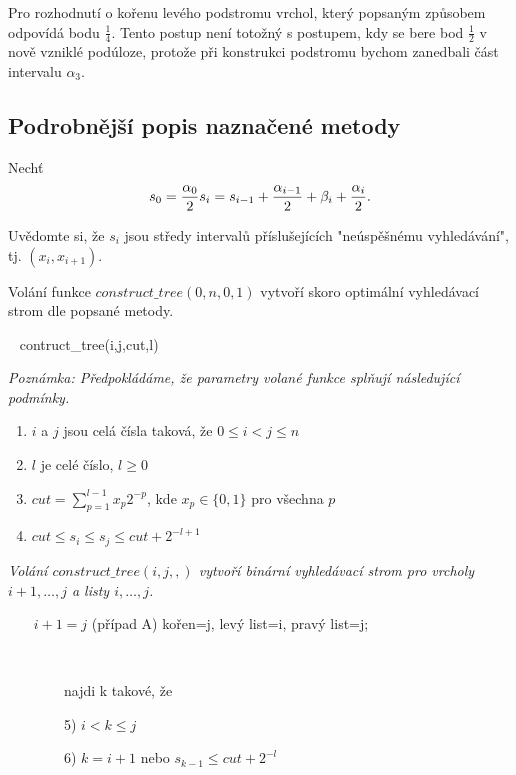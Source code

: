 \par
Pro rozhodnutí o kořenu levého podstromu vrchol, který popsaným způ\-sobem odpovídá bodu $\frac{1}{4}$. Tento postup není totožný s postupem, 
kdy se bere bod $\frac{1}{2}$ v 
nově vzniklé podúloze, protože při konstrukci podstromu bychom zanedbali část intervalu $\alpha_3$.

\subsection{Podrobnější popis naznačené metody}

Nechť 
\begin{equation} 
s_0 = \frac{\alpha_0}{2} \\ s_i = s_{i-1} + \frac{\alpha_{i-1}}{2} + \beta_i + \frac{\alpha_i}{2}.
\end{equation}

\par
Uvědomte si, že $s_i$ jsou středy intervalů příslušejících "neúspěšnému
vy\-hle\-dá\-vá\-ní", tj. $(x_i,x_{i+1})$.

\par
Volání funkce $construct\_tree(0,n,0,1)$ vytvoří skoro optimální
vyhledávací strom dle popsané metody.

\ \newline
{} contruct\_tree(i,j,cut,l)

\emph{Poznámka: Předpokládáme, že parametry volané funkce splňují následující podmínky.}
\begin{enumerate}
\item $i$ a $j$ jsou celá čísla taková, že $0 \leq i < j \leq n$
\item $l$ je celé číslo, $l \geq 0$
\item $cut=\sum_{p=1}^{l-1}{x_p 2^{-p}}$, kde $x_p \in \{0, 1\}$ pro všechna $p$
\item $cut \leq s_i \leq s_j \leq cut + 2^{-l+1}$
\end{enumerate}
\emph{Volání $construct\_tree(i,j,,)$ vytvoří binární vyhledávací strom pro vrcholy $i+1, \ldots, j$ a listy $i, \ldots, j$.}


\ \ \  $i+1=j$ (případ A)  kořen=j, levý list=i, pravý list=j;

\ \ \ \ \ 

\ \ \ \ \ \ \ \ najdi k takové, že

\ \ \ \ \ \ \ \ 5) $i < k \leq j$

\ \ \ \ \ \ \ \ 6) $k = i + 1$ nebo $s_{k-1} \leq cut + 2^{-l}$

